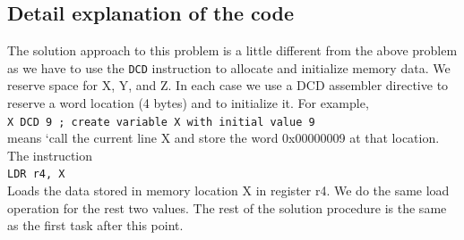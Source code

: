 \documentclass[footheight=20pt, footsepline, headheight=20pt, headsepline]{scrartcl}
\begin{document}
\subsection*{Detail explanation of the code}
The solution approach to this problem is a little different from the above problem as we have to use the \verb|DCD| instruction to allocate and initialize memory data. We reserve space for X, Y, and Z. In each case we use a DCD assembler directive to reserve a word location (4 bytes) and to initialize it. For example,\\
\verb|X DCD 9 ; create variable X with initial value 9|\\
means ‘call the current line X and store the word 0x00000009 at that location. The instruction \\
\verb|LDR r4, X| \\
Loads the data stored in memory location X in register r4. We do the same load operation for the rest two values.
The rest of the solution procedure is the same as the first task after this point.
\end{document}
